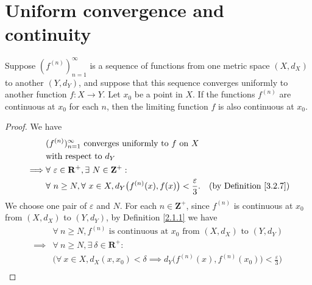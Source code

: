 \section{Uniform convergence and continuity}\label{sec 3.3}

\begin{theorem}\label{3.3.1}
    Suppose \((f^{(n)})_{n = 1}^\infty\) is a sequence of functions from one metric space \((X, d_X)\) to another \((Y, d_Y)\), and suppose that this sequence converges uniformly to another function \(f : X \to Y\).
    Let \(x_0\) be a point in \(X\).
    If the functions \(f^{(n)}\) are continuous at \(x_0\) for each \(n\), then the limiting function \(f\) is also continuous at \(x_0\).
\end{theorem}

\begin{proof}
    We have
    \begin{align*}
                 & (f^{(n)})_{n = 1}^\infty \text{ converges uniformly to } f \text{ on } X                                                         \\
                 & \text{with respect to } d_Y                                                                                                      \\
        \implies & \forall\ \varepsilon \in \mathbf{R}^+, \exists\ N \in \mathbf{Z}^+ :                                                             \\
                 & \forall\ n \geq N, \forall\ x \in X, d_Y\big(f^{(n)}(x), f(x)\big) < \frac{\varepsilon}{3}. & \text{(by Definition \ref{3.2.7})}
    \end{align*}
    We choose one pair of \(\varepsilon\) and \(N\).
    For each \(n \in \mathbf{Z}^+\), since \(f^{(n)}\) is continuous at \(x_0\) from \((X, d_X)\) to \((Y, d_Y)\), by Definition \ref{2.1.1} we have
    \begin{align*}
                 & \forall\ n \geq N, f^{(n)} \text{ is continuous at } x_0 \text{ from } (X, d_X) \text{ to } (Y, d_Y)                                                                                        \\
        \implies & \forall\ n \geq N, \exists\ \delta \in \mathbf{R}^+ :                                                                                                                                       \\
                 & \Big(\forall\ x \in X, d_X(x, x_0) < \delta \implies d_Y\big(f^{(n)}(x), f^{(n)}(x_0)\big) < \frac{\varepsilon}{3}\Big)                                                                     \\

\end{align*}
\end{proof}
